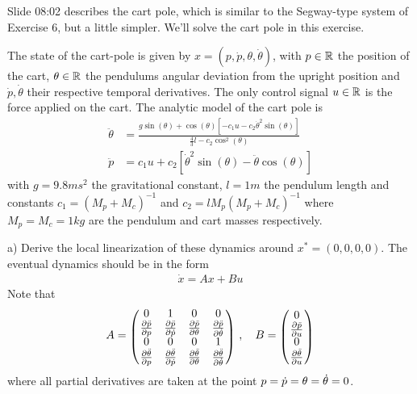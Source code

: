 

\renewcommand{\course}{Robotics}
\renewcommand{\coursepicture}{roboticsLecture}
\renewcommand{\coursedate}{Winter 2014}
\renewcommand{\exnum}{11}

\exercises



Slide 08:02 describes the cart pole, which is similar to the
Segway-type system of Exercise 6, but a little simpler. We'll solve
the cart pole in this exercise.

The state of the cart-pole is given by $x = (p,\dot p,
\theta,\dot\theta)$, with $p\in{\mathbb{R}}$ the position of the cart,
$\theta\in{\mathbb{R}}$ the pendulums angular deviation from the upright
position and $\dot p,\dot \theta$ their respective temporal
derivatives. The only control signal $u\in{\mathbb{R}}$ is the force applied on the
cart. The analytic model of the cart pole is
\begin{align}
\ddot\theta
 &= \frac{g\sin(\theta) + \cos(\theta)
         \left[-c_1 u - c_2\dot{\theta}^2\sin(\theta)\right]}
    {\frac{4}{3}l - c_2\cos^2(\theta)}\\
\ddot p
 &= c_1 u
  + c_2 \left[\dot\theta^2\sin(\theta) - \ddot\theta\cos(\theta)\right]
\end{align}
with $g = 9.8ms^2$ the gravitational constant, $l = 1m$ the pendulum
length and constants $c_1 = (M_p + M_c)^{-1}$ and $c_2 = l M_p(M_p +
M_c)^{-1}$ where $M_p = M_c = 1kg$ are the pendulum and cart masses
respectively.


a) Derive the local linearization of these dynamics around
$x^*=(0,0,0,0)$. The eventual dynamics should be in the form
\begin{align*}
\dot x = A x + B u
\end{align*}
Note that
\begin{align*}
A = \mat{cccc}{0 & 1 & 0 & 0 \\
 \frac{\del\ddot p}{\del p} & \frac{\del\ddot p}{\del\dot p} &
 \frac{\del\ddot p}{\del\t} & \frac{\del\ddot p}{\del\dot\t} \\
 0 & 0 & 0 & 1 \\
 \frac{\del\ddot \t}{\del p} & \frac{\del\ddot \t}{\del\dot p} &
 \frac{\del\ddot \t}{\del\t} & \frac{\del\ddot \t}{\del\dot\t} }
\comma
B = \mat{c}{0 \\
\frac{\del\ddot p}{\del u} \\
0 \\
\frac{\del\ddot\t}{\del u}}
\end{align*}
where all partial derivatives are taken at the point $p=\dot
p=\theta=\dot{\theta}=0$.

